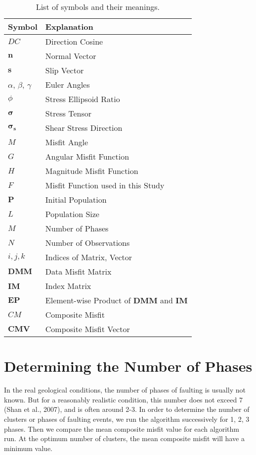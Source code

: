 \begin{table}[h!]
\centering
\footnotesize
 \renewcommand{\arraystretch}{1.2}
\begin{tabular}{l l}
    \hline
    Symbol & Explanation \\
    \hline
    $DC$ & Direction Cosine \\
    $\bm{n}$ & Normal Vector \\
    $\bm{s}$ & Slip Vector \\
    $\alpha$, $\beta$, $\gamma$ & Euler Angles \\
    $\phi$ & Stress Ellipsoid Ratio \\
    $\bm{\sigma}$ & Stress Tensor \\
    $\bm{\sigma_s}$ & Shear Stress Direction \\
    $M$ & Misfit Angle \\
    $G$ & Angular Misfit Function \\
    $H$ & Magnitude Misfit Function \\
    $F$ & Misfit Function used in this Study\\
    $\bm{P}$ & Initial Population \\
    $L$ & Population Size \\
    $M$ & Number of Phases \\
    $N$ & Number of Observations \\
    $i, j, k$ & Indices of Matrix, Vector \\
    $\bm{DMM}$ & Data Misfit Matrix \\
    $\bm{IM}$ & Index Matrix \\
    $\bm{EP}$ & Element-wise Product of $\bm{DMM}$ and $\bm{IM}$ \\
    $CM$ & Composite Misfit \\
    $\bm{CMV}$ & Composite Misfit Vector \\
    \hline
\end{tabular}
\caption{List of symbols and their meanings.}
\label{table:1}
\end{table}

\section{Determining the Number of Phases}
In the real geological conditions, the number of phases of faulting is usually not known. But for a reasonably realistic condition, this number does not exceed 7 (Shan et al., 2007), and is often around 2-3. In order to determine the number of clusters or phases of faulting events, we run the algorithm successively for 1, 2, 3 phases. Then we compare the mean composite misfit value for each algorithm run. At the optimum number of clusters, the mean composite misfit will have a minimum value.

